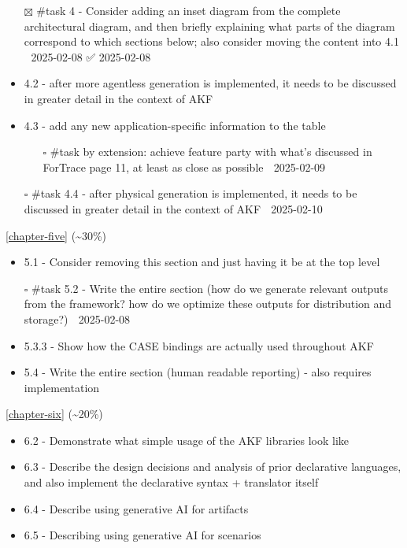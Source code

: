 \begin{itemize}
\tightlist
\item[$\boxtimes$]
  \#task 4 - Consider adding an inset diagram from the complete
  architectural diagram, and then briefly explaining what parts of the
  diagram correspond to which sections below; also consider moving the
  content into 4.1 📅 2025-02-08 ✅ 2025-02-08
\item
  4.2 - after more agentless generation is implemented, it needs to be
  discussed in greater detail in the context of AKF
\item
  4.3 - add any new application-specific information to the table

  \begin{itemize}
  \tightlist
  \item[$\square$]
    \#task by extension: achieve feature party with what's discussed in
    ForTrace page 11, at least as close as possible 📅 2025-02-09
  \end{itemize}
\item[$\square$]
  \#task 4.4 - after physical generation is implemented, it needs to be
  discussed in greater detail in the context of AKF 📅 2025-02-10
\end{itemize}

\autoref{chapter-five} (\textasciitilde30\%)

\begin{itemize}
\tightlist
\item
  5.1 - Consider removing this section and just having it be at the top
  level
\item[$\square$]
  \#task 5.2 - Write the entire section (how do we generate relevant
  outputs from the framework? how do we optimize these outputs for
  distribution and storage?) 📅 2025-02-08
\item
  5.3.3 - Show how the CASE bindings are actually used throughout AKF
\item
  5.4 - Write the entire section (human readable reporting) - also
  requires implementation
\end{itemize}

\autoref{chapter-six} (\textasciitilde20\%)

\begin{itemize}
\tightlist
\item
  6.2 - Demonstrate what simple usage of the AKF libraries look like
\item
  6.3 - Describe the design decisions and analysis of prior declarative
  languages, and also implement the declarative syntax + translator
  itself
\item
  6.4 - Describe using generative AI for artifacts
\item
  6.5 - Describing using generative AI for scenarios
\end{itemize}

